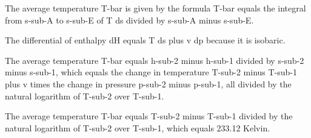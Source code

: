 The average temperature T-bar is given by the formula T-bar equals the integral from s-sub-A to s-sub-E of T ds divided by s-sub-A minus s-sub-E.

The differential of enthalpy dH equals T ds plus v dp because it is isobaric.

The average temperature T-bar equals h-sub-2 minus h-sub-1 divided by s-sub-2 minus s-sub-1, which equals the change in temperature T-sub-2 minus T-sub-1 plus v times the change in pressure p-sub-2 minus p-sub-1, all divided by the natural logarithm of T-sub-2 over T-sub-1.

The average temperature T-bar equals T-sub-2 minus T-sub-1 divided by the natural logarithm of T-sub-2 over T-sub-1, which equals 233.12 Kelvin.